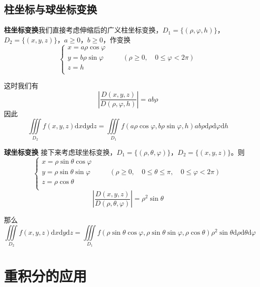 \documentclass[UTF8,openany]{book}
\begin{document}
	\subsection{柱坐标与球坐标变换}
	\par \textbf{柱坐标变换}\quad 我们直接考虑伸缩后的广义柱坐标变换，$D_1=\{(\rho,\varphi,h)\}$，$D_2=\{(x,y,z)\}$，$a\geqslant0$，$b\geqslant0$，作变换
	$$\begin{cases}
	x=a\rho\cos\varphi\\
	y=b\rho\sin\varphi \quad & \quad (\rho\geqslant0,\quad 0\leqslant\varphi<2\pi)\\
	z=h\\
	\end{cases}$$
	\par 这时我们有
	$$\left|\frac{D(x,y,z)}{D(\rho,\varphi,h)}\right|=ab\rho$$
	因此
	$$\iiint\limits_{D_2}f(x,y,z)\mathrm{d}x\mathrm{d}y\mathrm{d}z=
	\iiint\limits_{D_1}f(a\rho\cos\varphi,b\rho\sin\varphi,h)ab\rho\mathrm{d}\rho\mathrm{d}\varphi\mathrm{d}h$$
	\par \textbf{球坐标变换}\quad
	接下来考虑球坐标变换，$D_1=\{(\rho,\theta,\varphi)\}$，$D_2=\{(x,y,z)\}$。则
	$$\begin{cases}
	x=\rho\sin\theta\cos\varphi\\
	y=\rho\sin\theta\sin\varphi\quad &  \quad(\rho\geqslant0,\quad0\leqslant\theta\leqslant\pi,\quad0\leqslant\varphi<2\pi)\\
	z=\rho\cos\theta\\
	\end{cases}$$
	$$\left|\frac{D(x,y,z)}{D(\rho,\theta,\varphi)}\right|=\rho^2\sin\theta$$
	\par 那么
	$$\iiint\limits_{D_2}f(x,y,z)\mathrm{d}x\mathrm{d}y\mathrm{d}z=
	\iiint\limits_{D_1}f(\rho\sin\theta\cos\varphi,\rho\sin\theta\sin\varphi,\rho\cos\theta)\rho^2\sin\theta\mathrm{d}\rho\mathrm{d}\theta\mathrm{d}\varphi$$
	\section{重积分的应用}
\end{document}
